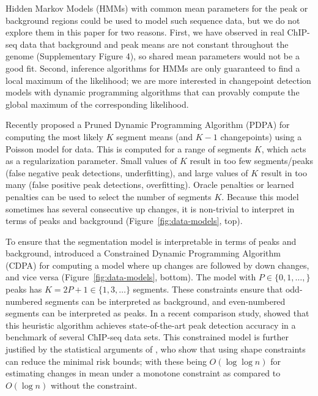 \documentclass[twoside,11pt]{article}
\begin{document}
Hidden Markov Models (HMMs) with common mean parameters for the peak
or background regions could be used to model such sequence data, but
we do not explore them in this paper for two reasons. First, we have
observed in real ChIP-seq data that background and peak means are not
constant throughout the genome (Supplementary Figure 4), so shared
mean parameters would not be a good fit. Second, inference algorithms
for HMMs are only guaranteed to find a local maximum of the
likelihood; we are more interested in changepoint detection models
with dynamic programming algorithms that can provably compute the
global maximum of the corresponding likelihood.

Recently \citet{cleynen2013segmentation} proposed a Pruned Dynamic
Programming Algorithm (PDPA) for computing the most likely $K$ segment
means (and $K-1$ changepoints) using a Poisson model for 
data. This is computed for a range
of segments $K$, which acts as a regularization parameter. Small
values of $K$ result in too few segments/peaks (false negative peak detections, underfitting), and
large values of $K$ result in too many (false positive peak detections, overfitting). Oracle penalties
\citep{cleynen2013segmentation} or learned penalties
\citep{HOCKING-penalties} can be used to select the number of segments
$K$.
Because this model sometimes has several consecutive up
changes, it is non-trivial to interpret in terms of peaks and
background (Figure~\ref{fig:data-models}, top).

To ensure that the segmentation model is interpretable in terms of
peaks and background, \citet{HOCKING-PeakSeg} introduced a Constrained
Dynamic Programming Algorithm (CDPA) for computing a model where up changes are followed by down changes, and vice
versa (Figure~\ref{fig:data-models}, bottom). The model with
$P\in\{0,1,\dots, \}$ peaks has $K=2P+1\in\{1, 3, \dots\}$
segments. These constraints ensure that odd-numbered segments can be
interpreted as background, and even-numbered segments can be
interpreted as peaks.
In a recent comparison study, \citet{HOCKING2016-chipseq} showed that
this heuristic algorithm achieves state-of-the-art peak detection
accuracy in a benchmark of several ChIP-seq data sets. This
constrained model is further justified by the statistical arguments of
\citet{minimax-changepoint}, who show that using shape constraints can
reduce the minimal risk bounds; with these being $O(\log \log n)$ for
estimating changes in mean under a monotone constraint as compared to
$O(\log n)$ without the constraint.
\end{document}
